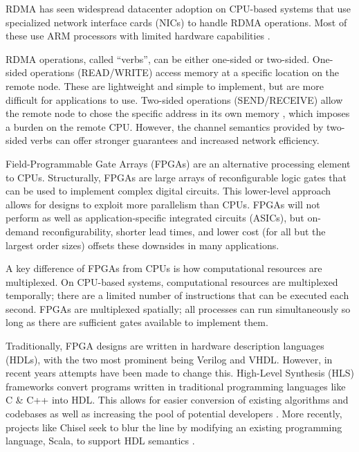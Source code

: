 RDMA has seen widespread datacenter adoption \autocite{strom,mencer-queue-2020} on CPU-based systems that use specialized network interface cards (NICs) to handle RDMA operations. Most of these use ARM processors with limited hardware capabilities \autocite{strom,honeycomb,rdma-reads}.


RDMA operations, called ``verbs'', can be either one-sided or two-sided. One-sided operations (READ/WRITE) access memory at a specific location on the remote node. These are lightweight and simple to implement, but are more difficult for applications to use. Two-sided operations (SEND/RECEIVE) allow the remote node to chose the specific address in its own memory \autocite{base}, which imposes a burden on the remote CPU. However, the channel semantics provided by two-sided verbs can offer stronger guarantees and increased network efficiency.


\label{sec:fpga}

Field-Programmable Gate Arrays (FPGAs) are an alternative processing element to CPUs. Structurally, FPGAs are large arrays of reconfigurable logic gates that can be used to implement complex digital circuits. This lower-level approach allows for designs to exploit more parallelism than CPUs. FPGAs will not perform as well as application-specific integrated circuits (ASICs), but on-demand reconfigurability, shorter lead times, and lower cost (for all but the largest order sizes) offsets these downsides in many applications.

A key difference of FPGAs from CPUs is how computational resources are multiplexed. On CPU-based systems, computational resources are multiplexed temporally; there are a limited number of instructions that can be executed each second. FPGAs are multiplexed spatially; all processes can run simultaneously so long as there are sufficient gates available to implement them.

Traditionally, FPGA designs are written in hardware description languages (HDLs), with the two most prominent being Verilog and VHDL. However, in recent years attempts have been made to change this. High-Level Synthesis (HLS) frameworks convert programs written in traditional programming languages like C \& C++ into HDL. This allows for easier conversion of existing algorithms and codebases as well as increasing the pool of potential developers \autocite{martin-destest-2009}. More recently, projects like Chisel seek to blur the line by modifying an existing programming language, Scala, to support HDL semantics \autocite{chisel}.

